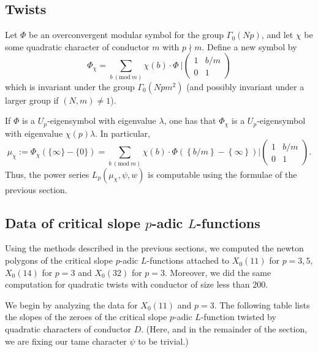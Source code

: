 \documentclass{amsart}
\theoremstyle{plain}
\theoremstyle{definition}
\newcommand{\psmallmat}[4]{\left( \begin{smallmatrix} #1 & #2 \\ #3 & #4 \end{smallmatrix} \right)}
\begin{document}
\subsection{Twists}

Let $\Phi$ be an overconvergent modular symbol for the group $\Gamma_0(Np)$, and let $\chi$ be some quadratic character of conductor $m$ with $p \nmid m$. Define a new symbol by 
$$
\Phi_\chi = \sum_{b~(\text{mod}~m)} \chi(b) \cdot \Phi ~\Big| \psmallmat{1}{b/m}{0}{1}
$$
which is invariant under the group $\Gamma_0(Npm^2)$ (and possibly invariant under a larger group if $(N,m) \neq 1$).

If $\Phi$ is a $U_p$-eigensymbol with eigenvalue $\lambda$, one has that $\Phi_\chi$ is a $U_p$-eigensymbol with eigenvalue $\chi(p) \lambda$.  In particular, 
$$
\mu_\chi := \Phi_\chi(\{\infty\} - \{0\}) = \sum_{b~(\text{mod}~m)} \chi(b) \cdot \Phi\left(\left\{b/m\right\} - \left\{\infty\right\} \right) \Big| \psmallmat{1}{b/m}{0}{1}.
$$
Thus, the power series $L_p(\mu_\chi, \psi,w)$ is computable using the formulae of the previous section.

\subsection{Data of critical slope $p$-adic $L$-functions}
\label{sec:data}

Using the methods described in the previous sections, we computed the newton polygons of the critical slope $p$-adic $L$-functions attached to $X_0(11)$ for $p=3,5$, $X_0(14)$ for $p=3$ and $X_0(32)$ for $p=3$. Moreover, we did the same computation for quadratic twists with conductor of size less than $200$.  

We begin by analyzing the data for $X_0(11)$ and $p=3$.  The following table lists the slopes of the zeroes of the critical slope $p$-adic $L$-function twisted by quadratic characters of conductor $D$.  (Here, and in the remainder of the section, we are fixing our tame character $\psi$ to be trivial.)

\renewcommand{\arraystretch}{1.4}

\vspace{.2cm}
\end{document}
